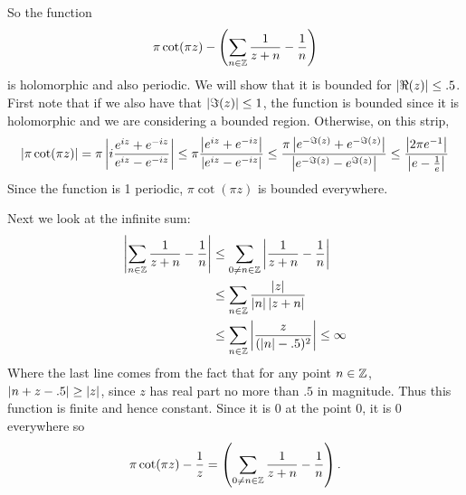 \documentclass{homework}
\begin{document}
\begin{solution}
                                                  So the function 
                                                  \[
                                                  \pi \cot(\pi z) -\left(\sum_{n\in \mathbb{Z}} \frac{1}{z+n} - \frac{1}{n}\right)
                                                  \]
                                                  is holomorphic and also periodic. We will show that it is bounded for $\left|\Re{(z)}\right|\leq .5$. First note that if we also have that $\left|\Im(z)\right|\leq 1$, the function is bounded since it is holomorphic and we are considering a bounded region.
                                                  Otherwise, on this strip,
                                                  \[
                                                  \left|\pi\cot(\pi z)\right| = \pi\left|i\frac{e^{iz}+e^{-iz}}{e^{iz}-e^{-iz}}\right|
                                                  \leq \pi \frac{\left|e^{iz}+e^{-iz}\right|}{\left|e^{iz}-e^{-iz}\right|}\leq \frac{\pi\left|e^{-\Im(z)}+e^{-\Im(z)}\right|}{\left|e^{-\Im(z)}-e^{\Im(z)}\right|}
                                                  \leq \frac{\left|2\pi e^{-1}\right|}{\left|e-\frac{1}{e}\right|}
                                                  \]
                                                  Since the function is 1 periodic, $\pi\cot(\pi z)$ is bounded everywhere.

                                                  Next we look at the infinite sum:
                                                  \begin{align*}
                                                  \left|\sum_{n\in \mathbb{Z}} \frac{1}{z+n} - \frac{1}{n}\right| &\leq \sum_{0\neq n\in \mathbb{Z}} \left|\frac{1}{z+n} - \frac{1}{n} \right|\\
                                                  &\leq \sum_{n\in \mathbb{Z}} \frac{\left|z\right|}{\left|n\right|\left|z+n\right|}\\
                                                  &\leq \sum_{n\in \mathbb{Z}}\left|\frac{z}{(\left|n\right|-.5)^2}\right|\leq \infty
                                                  \end{align*}
                                                  Where the last line comes from the fact that for any point $n\in \mathbb{Z}$, $\left|n+z-.5\right| \geq \left|z\right|$, since $z$ has real part no more than $.5$ in magnitude. Thus this function is finite and hence constant. Since it is 0 at the point 0, it is 0 everywhere so 
                                                  \[
                                                  \pi \cot(\pi z) -\frac{1}{z} = \left( \sum_{0\neq n\in \mathbb{Z}} \frac{1}{z+n} - \frac{1}{n}\right).
                                                  \]
                                                  \end{solution}
\end{document}
